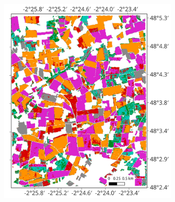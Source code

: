 \documentclass[journal,article,submit,pdftex,moreauthors]{Definitions/mdpi}
\providecommand{\DIFaddbeginFL}{} %
\providecommand{\DIFaddendFL}{} %
\providecommand{\DIFdelbeginFL}{} %
\providecommand{\DIFdelendFL}{} %
\begin{document}
\begin{figure}[H]
\DIFdelendFL \DIFaddbeginFL \begin{subfigure}[t]{0.35\linewidth}
	  \includegraphics[height=\linewidth,width=\textwidth]{round2_remote_sensing_Andrea_Gonzalez/figures/classification_maps/test_aoi_pixel-wise.pdf}
	\DIFaddendFL \caption{}
	\DIFdelbeginFL %
\DIFdelendFL \DIFaddbeginFL \label{fig:test_aoi_pixel-wise}
    \vspace*{2mm}
	\DIFaddendFL \end{subfigure}
    \begin{subfigure}[t]{0.15\linewidth}

\end{subfigure}
\end{figure}
\end{document}
